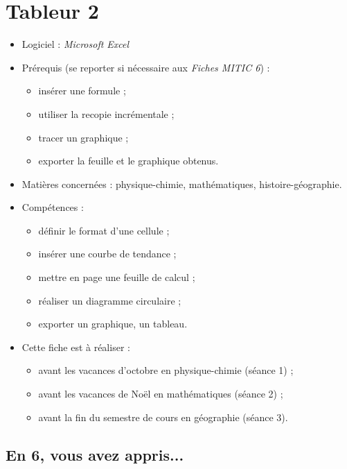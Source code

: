 \chapter{Tableur 2}  

{\footnotesize
\begin{itemize}
\item Logiciel : \emph{Microsoft Excel}
\item Prérequis (se reporter si nécessaire aux \emph{Fiches MITIC 6}) :
        \begin{itemize}
        \item insérer une formule ;
        \item utiliser la recopie incrémentale ;
        \item tracer un graphique ;
        \item exporter la feuille et le graphique obtenus.
        \end{itemize}
\item Matières concernées : physique-chimie, mathématiques, histoire-géographie.
\item Compétences : 
        \begin{itemize}
        \item définir le format d'une cellule ;
        \item insérer une courbe de tendance ;
        \item mettre en page une feuille de calcul ;
        \item réaliser un diagramme circulaire ;
        \item exporter un graphique, un tableau.
        \end{itemize}
\item Cette fiche est à réaliser :
        \begin{itemize}
        \item avant les vacances d'octobre en physique-chimie (séance 1) ;
        \item avant les vacances de Noël en mathématiques (séance 2) ;
        \item avant la fin du semestre de cours en géographie (séance 3). 
        \end{itemize}
\end{itemize}
}%


\section*{En 6, vous avez appris...}

